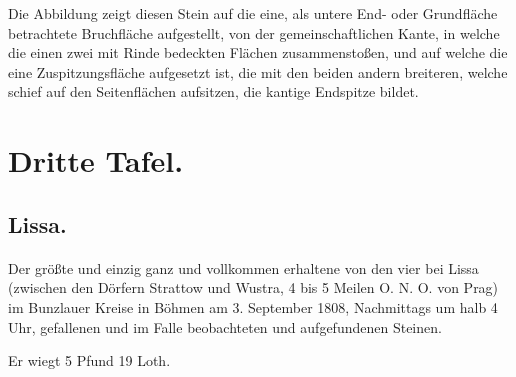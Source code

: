 \documentclass[a4paper, 11pt, oneside, german]{article}
\begin{document}
Die Abbildung zeigt diesen Stein auf die eine, als untere End- oder Grundfläche betrachtete Bruchfläche aufgestellt, von der gemeinschaftlichen Kante, in welche die einen zwei mit Rinde bedeckten Flächen zusammenstoßen, und auf welche die eine Zuspitzungsfläche aufgesetzt ist, die mit den beiden andern breiteren, welche schief auf den Seitenflächen aufsitzen, die kantige Endspitze bildet.
\clearpage
\section{Dritte Tafel.}
\subsection{Lissa.}
\paragraph{}
Der größte und einzig ganz und vollkommen erhaltene von den vier bei Lissa (zwischen den Dörfern Strattow und Wustra, 4 bis 5 Meilen O. N. O. von Prag) im Bunzlauer Kreise in Böhmen am 3. September 1808, Nachmittags um halb 4 Uhr, gefallenen und im Falle beobachteten und aufgefundenen Steinen.

Er wiegt 5 Pfund 19 Loth.
\end{document}
